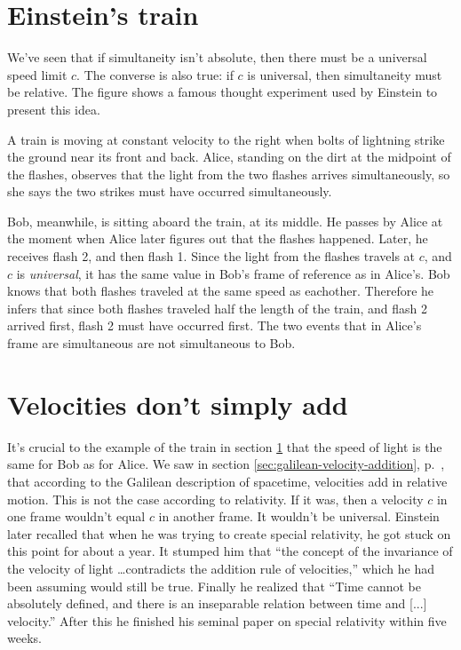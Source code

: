 \section{Einstein's train}\label{sec:einstein-train}

We've seen that if simultaneity isn't absolute, then there must be a universal speed limit $c$.
The converse is also true: if $c$ is universal, then simultaneity must be relative.
The figure shows a famous thought experiment used by Einstein to present this idea.

\begin{figure}[h]\label{fig:einstein-train}
\end{figure}

A train is moving at constant velocity to the right when bolts of lightning
strike the ground near its front and back. Alice, standing on the dirt at
the midpoint of the flashes, observes that the light from the two flashes
arrives simultaneously, so she says the two strikes must have occurred
simultaneously.

Bob, meanwhile, is sitting aboard the train, at its middle.
He passes by Alice at the moment when Alice later figures out that the
flashes happened. Later, he receives flash 2, and then flash 1. Since the light
from the flashes travels at $c$, and $c$ is \emph{universal}, it has the same
value in Bob's frame of reference as in Alice's. Bob knows that both flashes
traveled at the same speed as eachother. Therefore he infers
that since both flashes traveled half the length of the train, and flash 2 arrived first,
flash 2 must
have occurred first. The two events that in Alice's frame are simultaneous
are not simultaneous to Bob.

\section{Velocities don't simply add}

It's crucial to the example of the train
in section \ref{sec:einstein-train} that the speed of light is the same for Bob as for Alice.
We saw in section \ref{sec:galilean-velocity-addition}, p.~\pageref{sec:galilean-velocity-addition},
that according to the Galilean description of spacetime, velocities add in relative motion.
This is not the case according to relativity.
If it was, then a velocity $c$ in one frame wouldn't equal $c$ in another frame.
It wouldn't be universal. 
Einstein later recalled that when he was trying to create special relativity, he got stuck on
this point for about a year.
It stumped him that ``the concept of the invariance
of the velocity of light \ldots contradicts the addition rule of velocities,'' which he had been assuming
would still be true. Finally he realized that ``Time cannot be absolutely defined, and there is
an inseparable relation between time and [...] velocity.'' After this he finished his seminal paper
on special relativity within five weeks.

